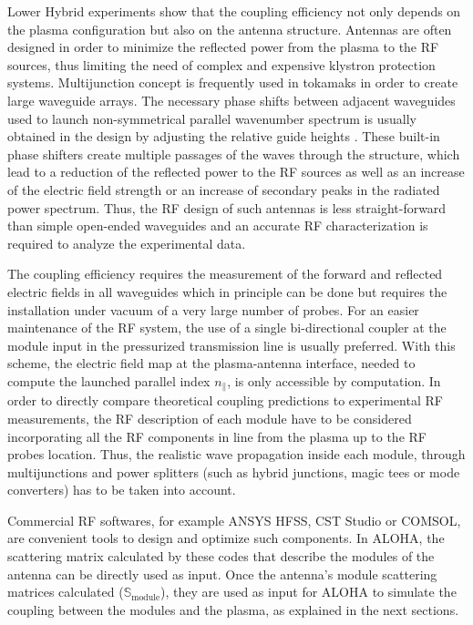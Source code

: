 Lower Hybrid experiments show that the coupling efficiency not only depends on the plasma configuration but also on the antenna structure. Antennas are often designed in order to minimize the reflected power from the plasma to the RF sources, thus limiting the need of complex and expensive klystron protection systems. Multijunction concept is frequently used in tokamaks in order to create large waveguide arrays. The necessary phase shifts between adjacent waveguides used to launch non-symmetrical parallel wavenumber spectrum is usually obtained in the design by adjusting the relative guide heights . These built-in phase shifters create multiple passages of the waves through the structure, which lead to a reduction of the reflected power to the RF sources as well as an increase of the electric field strength or an increase of secondary peaks in the radiated power spectrum. Thus, the RF design of such antennas is less straight-forward than simple open-ended waveguides and an accurate RF characterization is required to analyze the experimental data.

The coupling efficiency requires the measurement of the forward and reflected electric fields in all waveguides which in principle can be done but requires the installation under vacuum of a very large number of probes. For an easier maintenance of the RF system, the use of a single bi-directional coupler at the module input in the pressurized transmission line is usually preferred. With this scheme, the electric field map at the plasma-antenna interface, needed to compute the launched parallel index $n_{\parallel}$, is only accessible by computation. In order to directly compare theoretical coupling predictions to experimental RF measurements, the RF description of each module have to be considered incorporating all the RF components in line from the plasma up to the RF probes location. Thus, the realistic wave propagation inside each module, through multijunctions and power splitters (such as hybrid junctions, magic tees or mode converters) has to be taken into account. 

Commercial RF softwares, for example ANSYS HFSS, CST Studio or COMSOL, are convenient tools to design and optimize such components. In ALOHA, the scattering matrix calculated by these codes that describe the modules of the antenna can be directly used as input. Once the antenna's module scattering matrices calculated ($\mathbb{S}_{\mbox{module}}$), they are used as input for ALOHA to simulate the coupling between the modules and the plasma, as explained in the next sections.


